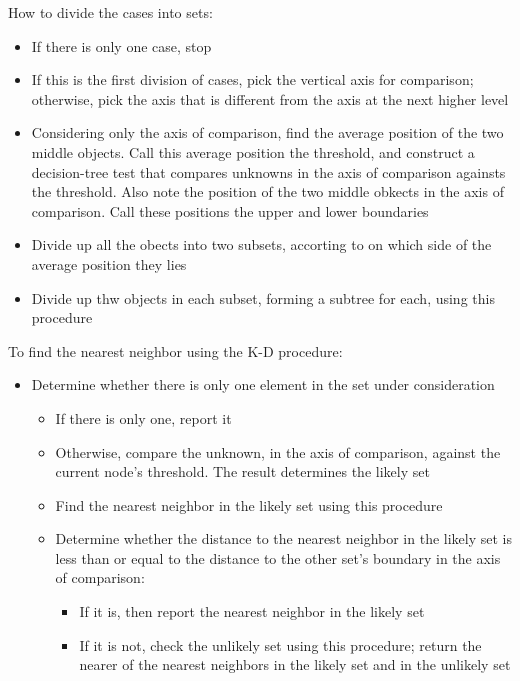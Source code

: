 How to divide the cases into sets:
\begin{itemize}
  \item If there is only one case, stop
  \item If this is the first division of cases, pick the vertical
    axis for comparison; otherwise, pick the axis that is
    different from the axis at the next higher level
  \item Considering only the axis of comparison, find the average
    position of the two middle objects. Call this average position
    the threshold, and construct a decision-tree test that
    compares unknowns in the axis of comparison againsts the
    threshold. Also note the position of the two middle obkects in
    the axis of comparison. Call these positions the upper and
    lower boundaries
  \item Divide up all the obects into two subsets, accorting to on
    which side of the average position they lies
  \item Divide up thw objects in each subset, forming a subtree
    for each, using this procedure
\end{itemize}

To find the nearest neighbor using the K-D procedure:
\begin{itemize}
  \item Determine whether there is only one element in the set
    under consideration
  \begin{itemize}
    \item If there is only one, report it
    \item Otherwise, compare the unknown, in the axis of
      comparison, against the current node's threshold. The result
      determines the likely set
    \item Find the nearest neighbor in the likely set using this
      procedure
    \item Determine whether the distance to the nearest neighbor
      in the likely set is less than or equal to the distance to
      the other set's boundary in the axis of comparison:
      \begin{itemize}
        \item If it is, then report the nearest neighbor in the
          likely set
        \item If it is not, check the unlikely set using this
          procedure; return the nearer of the nearest neighbors in
          the likely set and in the unlikely set
      \end{itemize}
  \end{itemize}
\end{itemize}



